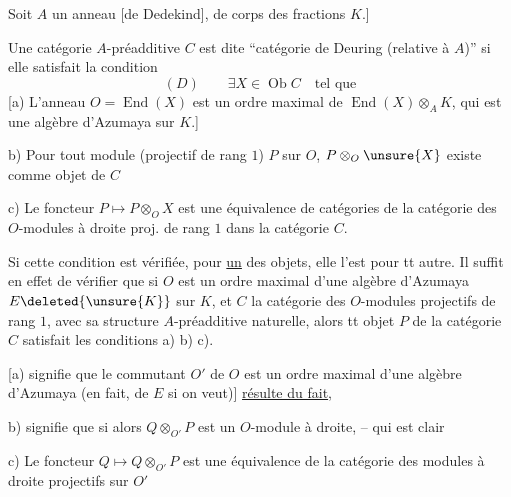 Soit $A$ un anneau  [de Dedekind], de corps des fractions $K$.]

Une catégorie $A$-préadditive $C$ est dite ``catégorie de Deuring (relative à $A$)'' si elle satisfait la condition
\[
(D)\qquad \exists X\in\operatorname{Ob}C\quad\text{tel que}
\]
[a) L'anneau $O=\operatorname{End}(X)$ est un ordre maximal de $\operatorname{End}(X)\otimes_A K$, qui est une algèbre d'Azumaya sur $K$.]

b) Pour tout module  (projectif de rang $1$) $P$ sur $O$, $P\otimes_O\unsure{X}$  existe comme objet de $C$

c) Le foncteur $P\longmapsto P\otimes_O X$ est une équivalence de catégories de la catégorie des $O$-modules à droite proj. de rang $1$ dans la catégorie $C$.

 Si cette condition est vérifiée,  pour \uline{un} des objets, elle l'est pour tt autre. Il suffit en effet de vérifier que si $O$ est un ordre maximal d'une algèbre d'Azumaya $E\deleted{\unsure{K}}$ sur $K$, et $C$ la catégorie des $O$-modules  projectifs de rang $1$, avec sa structure $A$-préadditive naturelle, alors tt objet $P$ de la catégorie $C$ satisfait les conditions a) b) c).

[a) signifie que le commutant $O'$ de $O$  est \inserted{$\simeq$} un ordre maximal d'une algèbre d'Azumaya (en fait, de $E$ si on veut)] \uline{résulte du fait},

b) signifie que si  alors $Q\otimes_{O'}P$ est un $O$-module à droite, -- qui est clair

c) Le foncteur $Q\longmapsto Q\otimes_{O'}P$ est une équivalence de la catégorie des modules à droite projectifs sur $O'$
